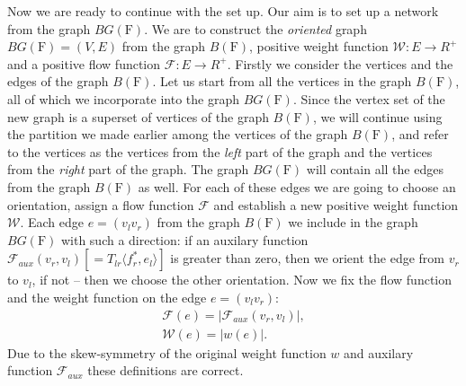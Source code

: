 \documentclass[12pt]{article}
\renewcommand{\cal}[1]{\mathcal{#1}}
\theoremstyle{definition}
\newcommand{\fsys}{\mathrm{F}}
\newcommand{\wt}{\mathcal{W}}
\numberwithin{remark}{section}
\numberwithin{theorem}{section}
\numberwithin{prop}{section}
\numberwithin{equation}{section}
\numberwithin{lemma}{section}
\numberwithin{prop_under_lemma}{lemma}
\begin{document}
    Now we are ready to continue with the set up.
    Our aim is to set up a network from the graph $BG(\fsys)$.
    We are to construct the \emph{oriented} graph $BG(\fsys) = (V, E)$ from the graph $B(\fsys)$,
    positive weight function $\wt: E \to R^{+}$ and a positive flow function
    $\cal{F}: E \to R^{+}$.
    Firstly we consider the vertices and the edges of the graph $B(\fsys)$.
    Let us start from all the vertices in the graph $B(\fsys)$,
    all of which we incorporate into the graph $BG(\fsys)$.
    Since the vertex set of the new graph is a superset of vertices of the graph $B(\fsys)$,
    we will continue using the partition we made earlier among the vertices of the graph $B(\fsys)$, and
    refer to the vertices as the vertices from the \textit{left} part of the graph and the vertices from the 
    \textit{right} part of the graph.
    The graph $BG(\fsys)$ will contain all the edges from the graph $B(\fsys)$ as well.
    For each of these edges we are going to choose an orientation, assign a flow function $\cal{F}$ and
    establish a new positive weight function $\wt$.
    Each edge $e = (v_l v_r)$ from the graph $B(\fsys)$ we include in the graph $BG(\fsys)$ with such a direction:
    if an auxilary function $\cal{F}_{aux}(v_r, v_l) [= T_{lr} \langle f^*_r, e_l \rangle]$ is greater than zero, then
    we orient the edge from $v_r$ to $v_l$, if not -- then we choose the other orientation.
    Now we fix the flow function and the weight function on the edge $e = (v_l v_r)$:
    \begin{align*}
      \cal{F}(e) = \left| \cal{F}_{aux}(v_r, v_l) \right|,\\
      \wt(e) = \left| w(e)\right|.
    \end{align*}
    Due to the skew-symmetry of the original weight function $w$ and auxilary function $\cal{F}_{aux}$
    these definitions are correct.
    
\end{document}
